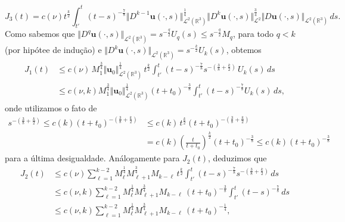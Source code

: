 \documentclass[a4paper, 11pt]{book}
\theoremstyle{definition}
\newcommand{\bR}{\mathbb{R}}
\newcommand{\bu}{\mathbf{u}}
\newcommand{\cL}{\mathcal{L}}
\begin{document}
\begin{prf}
\[    \]
    \[
        J_3(t) = c(\nu) t^{\frac{k}{2}} \int_{t'}^t ( t- s)^{-\frac{7}{8}} \Vert D^{k-1} \bu(\cdot,s) \Vert_{\cL^2(\bR^3)}^{\frac{1}{4}} \Vert D^{k} \bu(\cdot,s) \Vert_{\cL^2}^{\frac{3}{4}} \Vert D \bu(\cdot,s) \Vert_{\cL^2(\bR^3)} \,ds.
    \]
    Como sabemos que $\Vert D^q \bu(\cdot,s) \Vert_{\cL^2(\bR^3)} = s^{-\frac{q}{2}} U_q(s) \leqslant s^{-\frac{q}{2}} M_q$, para todo $q < k$ (por hipótee de indução) e $\Vert D^k\bu(\cdot,s) \Vert_{\cL^2(\bR^3)} = s^{-\frac{k}{2}} U_k(s)$, obtemos
    \begin{equation} \label{eq:t1}
        \begin{aligned}
            J_1(t) &\leqslant c(\nu) \, M_1^{\frac{3}{4}} \Vert \bu_0 \Vert_{\cL^2(\bR^3)}^{\frac{1}{4}} \, t^{\frac{k}{2}} \int_{t'}^t (t - s)^{-\frac{7}{8}} s^{-\left( \frac{3}{8} + \frac{k}{2} \right)} \,U_k(s) \,ds\\
            &\leqslant c(\nu,k) M_1^{\frac{3}{4}} \Vert \bu_0 \Vert_{\cL^2(\bR^3)}^{\frac{1}{4}} (t + t_0)^{-\frac{3}{8}} \int_{t'}^t (t- s)^{-\frac{7}{8}} U_k(s) \,ds, 
        \end{aligned}
    \end{equation}
    onde utilizamos o fato de
    \[
        \begin{aligned}
            s^{-\left( \frac{3}{8} + \frac{k}{2} \right)} \leqslant c(k)( t + t_0)^{-\left( \frac{3}{8} + \frac{k}{2} \right)} &\leqslant c(k)\,t^{\frac{k}{2}} (t + t_0)^{-\left( \frac{3}{8} + \frac{k}{2} \right)} \\
            &= c(k)\left( \frac{t}{t + t_0} \right)^{\frac{k}{2}} (t + t_0)^{-\frac{3}{8}} \leqslant c(k) (t + t_0)^{-\frac{3}{8}}
        \end{aligned}
    \]
    para a última desigualdade.
    Análogamente para $J_2(t)$, deduzimos que
    \begin{equation} \label{eq:t2}
        \begin{aligned}
            J_2(t) &\leqslant c(\nu) \sum_{\ell=1}^{k-2} M_{\ell}^{\frac{1}{4}} M_{\ell + 1}^{\frac{3}{4}} M_{k-\ell} \, t^{\frac{k}{2}} \int_{t'}^t (t - s)^{-\frac{7}{8}} s^{-\left( \frac{3}{8} + \frac{k}{2} \right)} \,ds\\
            &\leqslant c(\nu,k) \sum_{\ell=1}^{k-2} M_{\ell}^{\frac{1}{4}} M_{\ell + 1}^{\frac{3}{4}} M_{k-\ell} \, (t + t_0)^{-\frac{3}{8}} \int_{t'}^t (t - s)^{-\frac{7}{8}} \,ds\\
            &\leqslant c(\nu,k) \sum_{\ell=1}^{k-2} M_{\ell}^{\frac{1}{4}} M_{\ell + 1}^{\frac{3}{4}} M_{k-\ell} \, (t + t_0)^{-\frac{1}{4}},

\end{aligned}
\end{equation}
\end{prf}
\end{document}
